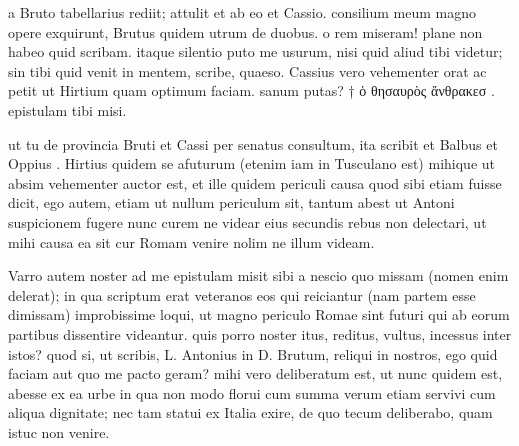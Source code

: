


 a Bruto tabellarius rediit; attulit et ab eo et Cassio. consilium meum magno opere exquirunt, Brutus quidem utrum de duobus. o rem miseram! plane non habeo quid scribam. itaque silentio puto me usurum, nisi quid aliud tibi videtur; sin tibi quid venit in mentem, scribe, quaeso. Cassius vero vehementer orat ac petit ut Hirtium quam optimum faciam. sanum putas? † ὁ θησαυρὸς ἄνθρακεσ . epistulam tibi misi.

 ut tu de provincia Bruti et Cassi per senatus consultum, ita scribit et Balbus et Oppius . Hirtius quidem se afuturum (etenim iam in Tusculano est) mihique ut absim vehementer auctor est, et ille quidem periculi causa quod sibi etiam fuisse dicit, ego autem, etiam ut nullum periculum sit, tantum abest ut Antoni suspicionem fugere nunc curem ne videar eius secundis rebus non delectari, ut mihi causa ea sit cur Romam venire nolim ne illum videam.

 Varro autem noster ad me epistulam misit sibi a nescio quo missam (nomen enim delerat); in qua scriptum erat veteranos eos qui reiciantur (nam partem esse dimissam) improbissime loqui, ut magno periculo Romae sint futuri qui ab eorum partibus dissentire videantur. quis porro noster itus, reditus, vultus, incessus inter istos? quod si, ut scribis, L. Antonius in D. Brutum, reliqui in nostros, ego quid faciam aut quo me pacto geram? mihi vero deliberatum est, ut nunc quidem est, abesse ex ea urbe in qua non modo florui cum summa verum etiam servivi cum aliqua dignitate; nec tam statui ex Italia exire, de quo tecum deliberabo, quam istuc non venire.
